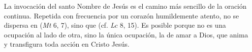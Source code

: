  La invocación del santo Nombre de Jesús es el camino más sencillo de la oración continua. Repetida con frecuencia por un corazón humildemente atento, no se dispersa en  (\emph{Mt} 6, 7), sino que  (cf. \emph{Lc} 8, 15). Es posible  porque no es una ocupación al lado de otra, sino la única ocupación, la de amar a Dios, que anima y transfigura toda acción en Cristo Jesús.
